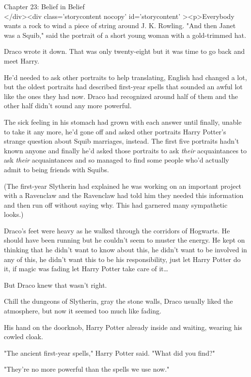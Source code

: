 
Chapter 23: Belief in Belief\\
</div><div  class='storycontent nocopy' id='storycontent' ><p>Everybody wants a 
rock to wind a piece of string around J. K. Rowling.
\sbreak
"And then Janet was a Squib," said the portrait of a short young woman with a 
gold-trimmed hat.

Draco wrote it down. That was only twenty-eight but it was time to go back and 
meet Harry.

He'd needed to ask other portraits to help translating, English had changed a 
lot, but the oldest portraits had described first-year spells that sounded an 
awful lot like the ones they had now. Draco had recognized around half of them 
and the other half didn't sound any more powerful.

The sick feeling in his stomach had grown with each answer until finally, 
unable to take it any more, he'd gone off and asked other portraits Harry 
Potter's strange question about Squib marriages, instead. The first five 
portraits hadn't known anyone and finally he'd asked those portraits to ask 
\emph{their} acquaintances to ask \emph{their} acquaintances and so managed to 
find some people who'd actually admit to being friends with Squibs.

(The first-year Slytherin had explained he was working on an important project 
with a Ravenclaw and the Ravenclaw had told him they needed this information 
and then run off without saying why. This had garnered many sympathetic looks.)

Draco's feet were heavy as he walked through the corridors of Hogwarts. He 
should have been running but he couldn't seem to muster the energy. He kept on 
thinking that he didn't want to know about this, he didn't want to be involved 
in any of this, he didn't want this to be his responsibility, just let Harry 
Potter do it, if magic was fading let Harry Potter take care of it{\ldots}

But Draco knew that wasn't right.

Chill the dungeons of Slytherin, gray the stone walls, Draco usually liked the 
atmosphere, but now it seemed too much like fading.

His hand on the doorknob, Harry Potter already inside and waiting, wearing his 
cowled cloak.

"The ancient first-year spells," Harry Potter said. "What did you find?"

"They're no more powerful than the spells we use now."

